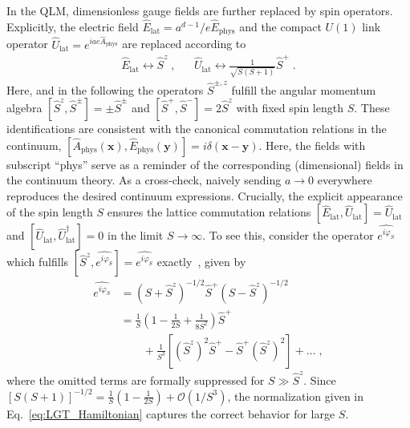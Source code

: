\documentclass[aps,prl,reprint,twocolumn,superscriptaddress,floatfix,nofootinbib]{revtex4-1}
\begin{document}
In the QLM, dimensionless gauge fields are further replaced by spin operators. Explicitly, the electric field $\hat{E}_\text{lat} = a^{d-1}/e \hat{E}_\text{phys}$ and the compact $U(1)$ link operator $\hat{U}_\text{lat} = e^{iae \hat{A}_\text{phys}}$ are replaced according to
\begin{align}
	\hat{E}_\text{lat} \leftrightarrow  \hat{S}^z \;, &&
	\hat{U}_\text{lat}  \leftrightarrow \frac{1}{\sqrt{S(S+1)}} \hat{S}^+ \;.
\end{align}
Here, and in the following the operators $\hat{S}^{\pm,z}$ fulfill the angular momentum algebra $[\hat{S}^z,\hat{S}^{\pm}] =\pm \hat{S}^\pm$ and $[\hat{S}^+,\hat{S}^{-}] =2\hat{S}^z$ with fixed spin length $S$.
These identifications are consistent with the canonical commutation relations in the continuum, $\left[\hat{A}_\text{phys}(\mathbf{x}), \hat{E}_\text{phys}(\mathbf{y})\right] = i \delta(\mathbf{x} - \mathbf{y})$. Here, the fields with subscript ``phys'' serve as a reminder of the corresponding (dimensional) fields in the continuum theory. As a cross-check, naively sending $a\rightarrow 0$ everywhere reproduces the desired continuum expressions. Crucially, the explicit appearance of the spin length $S$ ensures the lattice commutation relations $\left[\hat{E}_\text{lat}, \hat{U}_\text{lat}\right] = \hat{U}_\text{lat}$ and $\left[\hat{U}_\text{lat},\hat{U}^\dagger_\text{lat}\right] = 0$ in the limit $S\rightarrow \infty$. To see this, consider the operator $\hat{e^{i\varphi_S}}$ which fulfills $\left[\hat{S}^z, \hat{e^{i\varphi_S}}\right] = \hat{e^{i\varphi_S}}$ exactly~\cite{Haldane1983}, given by
\begin{align}
	\hat{e^{i\varphi_S}} &= (S + \hat{S}^z)^{-1/2} \hat{S}^+ (S-\hat{S}^z)^{-1/2} \\
	&= \frac{1}{S} \left(1 - \frac{1}{2S} + \frac{1}{8S^2}\right) \hat{S}^+
	\nonumber \\& \qquad+ \frac{1}{S^3} \left[\left(\hat{S}^z\right)^2 \hat{S}^+ - \hat{S}^+ \left(\hat{S}^z\right)^2\right] + \dots \;,
\end{align}
where the omitted terms are formally suppressed for $S \gg \hat{S}^z$. Since $\left[S(S+1)\right]^{-1/2}  = \frac{1}{S} \left(1 - \frac{1}{2S} \right) + \mathcal{O}(1/S^3)$, the normalization
given in Eq.~{\eqref{eq:LGT_Hamiltonian}} captures the correct behavior for large $S$.

\end{document}
